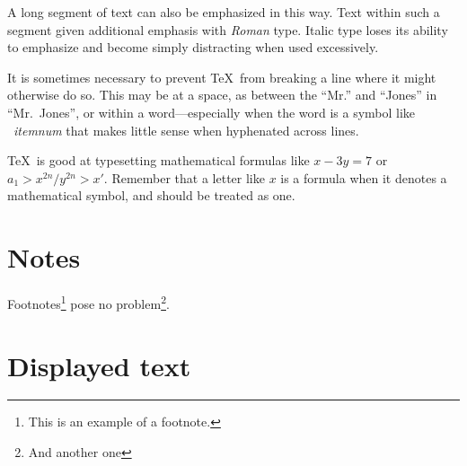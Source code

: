 \documentclass[ba]{imsart}
\numberwithin{equation}{section}
\theoremstyle{plain}
\begin{document}
\begin{em}
  A long segment of text can also be emphasized in this way.  Text
  within such a segment given additional emphasis with\/ {\em Roman}
  type.  Italic type loses its ability to emphasize and become simply
  distracting when used excessively.
\end{em}

It is sometimes necessary to prevent \TeX\ from breaking a line where
it might otherwise do so.  This may be at a space, as between the
``Mr.'' and ``Jones'' in
``Mr.~Jones'', %
or within a word---especially when the word is a symbol like \mbox{\em
  itemnum\/} that makes little sense when hyphenated across lines.

\TeX\ is good at typesetting mathematical formulas like \( x-3y = 7 \)
or \( a_{1} > x^{2n} / y^{2n} > x' \).  Remember that a letter like
$x$ %
is a formula when it denotes a mathematical symbol, and should be
treated as one.


\section{Notes}

Footnotes\footnote{This is an example of a footnote.}  pose no
problem\footnote{And another one}.

\section{Displayed text}
\end{document}
